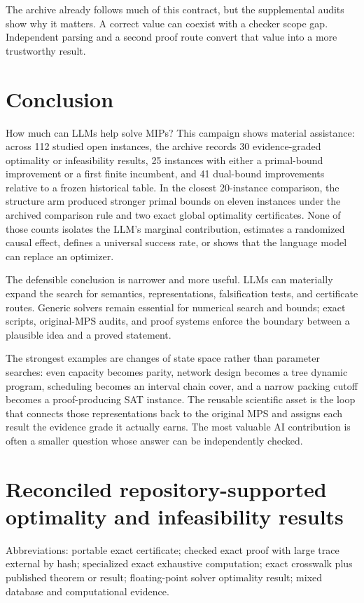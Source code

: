 \documentclass[11pt,letterpaper]{article}
\begin{document}
The archive already follows much of this contract, but the supplemental audits show why it matters. A correct value can coexist with a checker scope gap. Independent parsing and a second proof route convert that value into a more trustworthy result.

\section{Conclusion}

How much can LLMs help solve MIPs? This campaign shows material assistance: across 112 studied open instances, the archive records 30 evidence-graded optimality or infeasibility results, 25 instances with either a primal-bound improvement or a first finite incumbent, and 41 dual-bound improvements relative to a frozen historical table. In the closest 20-instance comparison, the structure arm produced stronger primal bounds on eleven instances under the archived comparison rule and two exact global optimality certificates. None of those counts isolates the LLM's marginal contribution, estimates a randomized causal effect, defines a universal success rate, or shows that the language model can replace an optimizer.

The defensible conclusion is narrower and more useful. LLMs can materially expand the search for semantics, representations, falsification tests, and certificate routes. Generic solvers remain essential for numerical search and bounds; exact scripts, original-MPS audits, and proof systems enforce the boundary between a plausible idea and a proved statement.

The strongest examples are changes of state space rather than parameter searches: even capacity becomes parity, network design becomes a tree dynamic program, scheduling becomes an interval chain cover, and a narrow packing cutoff becomes a proof-producing SAT instance. The reusable scientific asset is the loop that connects those representations back to the original MPS and assigns each result the evidence grade it actually earns. The most valuable AI contribution is often a smaller question whose answer can be independently checked.

\clearpage\appendix\section{Reconciled repository-supported optimality and infeasibility results}

Abbreviations: \texttt{} portable exact certificate; \texttt{} checked exact proof with large trace external by hash; \texttt{} specialized exact exhaustive computation; \texttt{} exact crosswalk plus published theorem or result; \texttt{} floating-point solver optimality result; \texttt{} mixed database and computational evidence.
\end{document}
